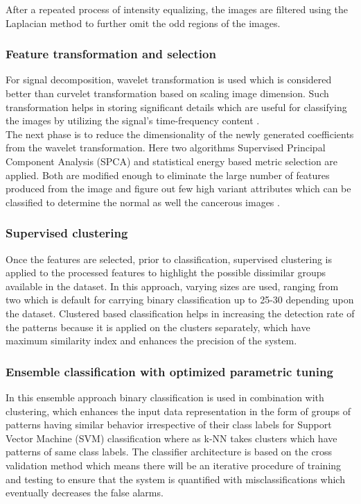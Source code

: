 \documentclass[hidelinks,12pt]{article}
\begin{document}
After a repeated process of intensity equalizing,
the images are filtered using the Laplacian method to
further omit the odd regions of the images.

\subsubsection{Feature transformation and selection}

For signal decomposition, wavelet transformation
is used which is considered better than curvelet
transformation based on scaling image dimension. Such
transformation helps in storing significant details which
are useful for classifying the images by utilizing the
signal’s time-frequency content .\\

The next phase is to reduce the dimensionality of
the newly generated coefficients from the wavelet
transformation. Here two algorithms Supervised Principal
Component Analysis (SPCA) and statistical energy based
metric selection are applied. Both are modified enough to
eliminate the large number of features produced from the
image and figure out few high variant attributes which can
be classified to determine the normal as well the cancerous
images .

\subsubsection{Supervised clustering}
Once the features are selected, prior to
classification, supervised clustering is applied to the
processed features to highlight the possible dissimilar
groups available in the dataset. In this approach, varying
sizes are used, ranging from two which is default for
carrying binary classification up to 25-30 depending upon
the dataset. Clustered based classification helps in
increasing the detection rate of the patterns because it is
applied on the clusters separately, which have maximum
similarity index and enhances the precision of the system.


\subsubsection{Ensemble classification with optimized parametric
tuning}

In this ensemble approach binary classification is
used in combination with clustering, which enhances the
input data representation in the form of groups of patterns
having similar behavior irrespective of their class labels
for Support Vector Machine (SVM) classification where
as k-NN takes clusters which have patterns of same class
labels. The classifier architecture is based on the cross
validation method which means there will be an iterative
procedure of training and testing to ensure that the system
is quantified with misclassifications which eventually
decreases the false alarms.
\end{document}
